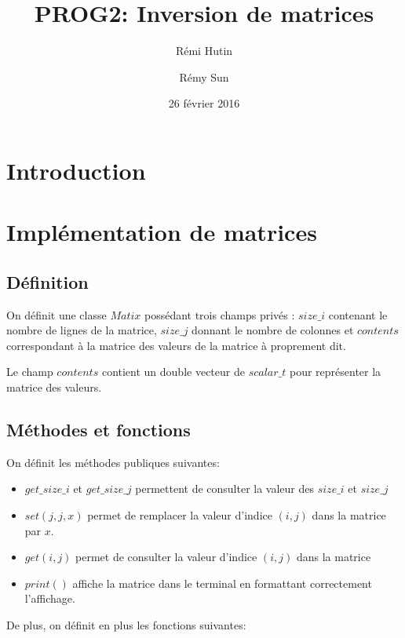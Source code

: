 \documentclass[a4paper,11pt]{article}
\title{PROG2: Inversion de matrices}
\author{Rémi Hutin \and Rémy Sun}
\date{26 février 2016}
\begin{document}
\maketitle

\begin{abstract}

\end{abstract}

\section*{Introduction}


\section{Implémentation de matrices}

\subsection{Définition}

On définit une classe $Matix$ possédant trois champs privés : $size\_i$ contenant le nombre de lignes de la matrice, $size\_j$ donnant le nombre de colonnes et
 $contents$ correspondant à la matrice des valeurs de la matrice à proprement dit.

Le champ $contents$ contient un double vecteur de $scalar\_t$ pour représenter la matrice des valeurs.

\subsection{Méthodes et fonctions}

On définit les méthodes publiques suivantes:

\begin{itemize}
\item $get\_size\_i$ et $get\_size\_j$ permettent de consulter la valeur des $size\_i$ et $size\_j$
\item $set(j,j,x)$ permet de remplacer la valeur d'indice $(i,j)$ dans la matrice par $x$.
\item $get(i,j)$ permet de consulter la valeur d'indice $(i,j)$ dans la matrice 
\item $print()$ affiche la matrice dans le terminal en formattant correctement l'affichage.
\end{itemize}

De plus, on définit en plus les fonctions suivantes:
\end{document}
